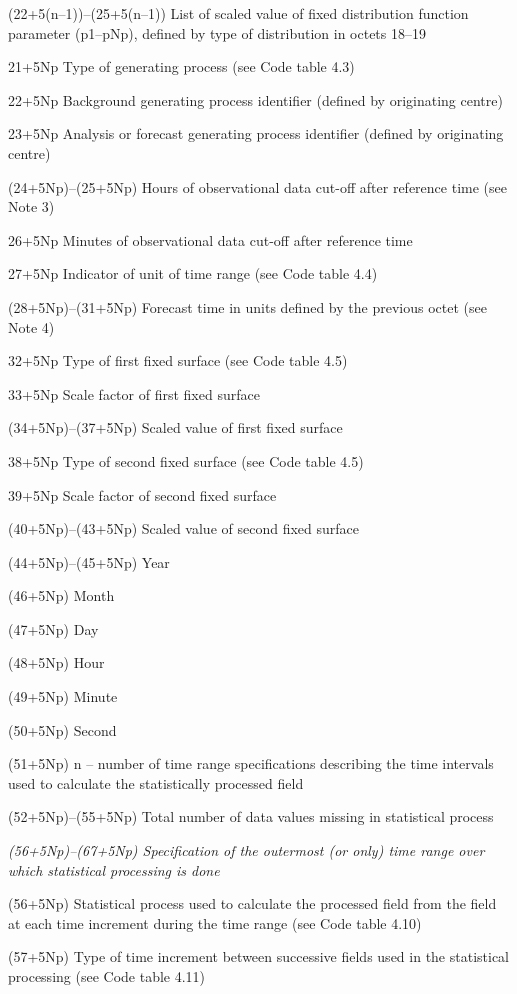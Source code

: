 (22+5(n--1))--(25+5(n--1)) List of scaled value of fixed distribution function parameter (p1--pNp), defined by type of distribution in octets 18--19

21+5Np Type of generating process (see Code table 4.3)

22+5Np Background generating process identifier (defined by originating centre)

23+5Np Analysis or forecast generating process identifier (defined by originating centre)

(24+5Np)--(25+5Np) Hours of observational data cut-off after reference time (see Note 3)

26+5Np Minutes of observational data cut-off after reference time

27+5Np Indicator of unit of time range (see Code table 4.4)

(28+5Np)--(31+5Np) Forecast time in units defined by the previous octet (see Note 4)

32+5Np Type of first fixed surface (see Code table 4.5)

33+5Np Scale factor of first fixed surface

(34+5Np)--(37+5Np) Scaled value of first fixed surface

38+5Np Type of second fixed surface (see Code table 4.5)

39+5Np Scale factor of second fixed surface

(40+5Np)--(43+5Np) Scaled value of second fixed surface

(44+5Np)--(45+5Np) Year

(46+5Np) Month

(47+5Np) Day

(48+5Np) Hour

(49+5Np) Minute

(50+5Np) Second

(51+5Np) n -- number of time range specifications describing the time intervals used to calculate the statistically processed field

(52+5Np)--(55+5Np) Total number of data values missing in statistical process

\emph{(56+5Np)--(67+5Np) Specification of the outermost (or only) time range over which statistical processing is done}

(56+5Np) Statistical process used to calculate the processed field from the field at each time increment during the time range (see Code table 4.10)

(57+5Np) Type of time increment between successive fields used in the statistical processing (see Code table 4.11)

